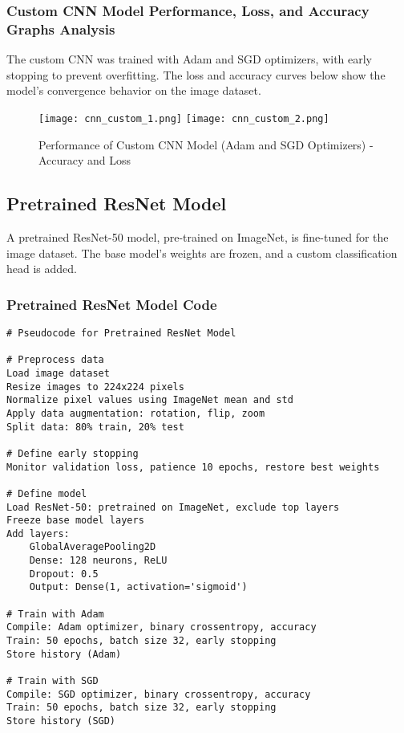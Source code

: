 \documentclass[a4paper,12pt]{article}
\begin{document}
\subsubsection*{Custom CNN Model Performance, Loss, and Accuracy Graphs Analysis}
The custom CNN was trained with Adam and SGD optimizers, with early stopping to prevent overfitting. The loss and accuracy curves below show the model's convergence behavior on the image dataset.

\begin{figure}[h]
    \centering
    \texttt{[image: cnn\_custom\_1.png]}
    \texttt{[image: cnn\_custom\_2.png]}
    \caption{Performance of Custom CNN Model (Adam and SGD Optimizers) - Accuracy and Loss}
\end{figure}

\subsection*{Pretrained ResNet Model}
A pretrained ResNet-50 model, pre-trained on ImageNet, is fine-tuned for the image dataset. The base model’s weights are frozen, and a custom classification head is added.

\subsubsection*{Pretrained ResNet Model Code}
\begin{verbatim}
# Pseudocode for Pretrained ResNet Model

# Preprocess data
Load image dataset
Resize images to 224x224 pixels
Normalize pixel values using ImageNet mean and std
Apply data augmentation: rotation, flip, zoom
Split data: 80% train, 20% test

# Define early stopping
Monitor validation loss, patience 10 epochs, restore best weights

# Define model
Load ResNet-50: pretrained on ImageNet, exclude top layers
Freeze base model layers
Add layers:
    GlobalAveragePooling2D
    Dense: 128 neurons, ReLU
    Dropout: 0.5
    Output: Dense(1, activation='sigmoid')

# Train with Adam
Compile: Adam optimizer, binary crossentropy, accuracy
Train: 50 epochs, batch size 32, early stopping
Store history (Adam)

# Train with SGD
Compile: SGD optimizer, binary crossentropy, accuracy
Train: 50 epochs, batch size 32, early stopping
Store history (SGD)
\end{verbatim}
\end{document}
